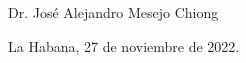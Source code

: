 \begin{opinion}
\vspace{1cm}

\begin{flushleft}
Dr. José Alejandro Mesejo Chiong

La Habana, 27 de noviembre de 2022.
\end{flushleft} 


\end{opinion}